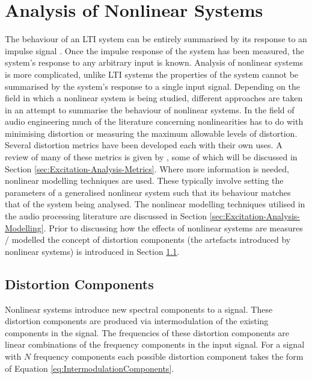 \section{Analysis of Nonlinear Systems}
\label{sec:Excitation-AnalysisOfNonlinearSystems}
	The behaviour of an LTI system can be entirely summarised by its response to an impulse signal
	\citep{phillips2007signals}. Once the impulse response of the system has been measured, the system's response to any
	arbitrary input is known. Analysis of nonlinear systems is more complicated, unlike LTI systems the properties of
	the system cannot be summarised by the system's response to a single input signal. Depending on the field in which a
	nonlinear system is being studied, different approaches are taken in an attempt to summarise the behaviour of
	nonlinear systems. In the field of audio engineering much of the literature concerning nonlinearities has to do with
	minimising distortion or measuring the maximum allowable levels of distortion. Several distortion metrics have been
	developed each with their own uses. A review of many of these metrics is given by \cite{voishvillo2006assessment},
	some of which will be discussed in Section \ref{sec:Excitation-Analysis-Metrics}. Where more information is needed,
	nonlinear modelling techniques are used. These typically involve setting the parameters of a generalised nonlinear
	system such that its behaviour matches that of the system being analysed. The nonlinear modelling techniques
	utilised in the audio processing literature are discussed in Section \ref{sec:Excitation-Analysis-Modelling}. Prior
	to discussing how the effects of nonlinear systems are measures / modelled the concept of distortion components (the
	artefacts introduced by nonlinear systems) is introduced in Section \ref{sec:Excitation-Analysis-Components}.

	\subsection{Distortion Components}
	\label{sec:Excitation-Analysis-Components}
		Nonlinear systems introduce new spectral components to a signal. These distortion components are produced
		via intermodulation of the existing components in the signal. The frequencies of these distortion components
		are linear combinations of the frequency components in the input signal. For a signal with $N$ frequency
		components each possible distortion component takes the form of Equation \ref{eq:IntermodulationComponents}.

